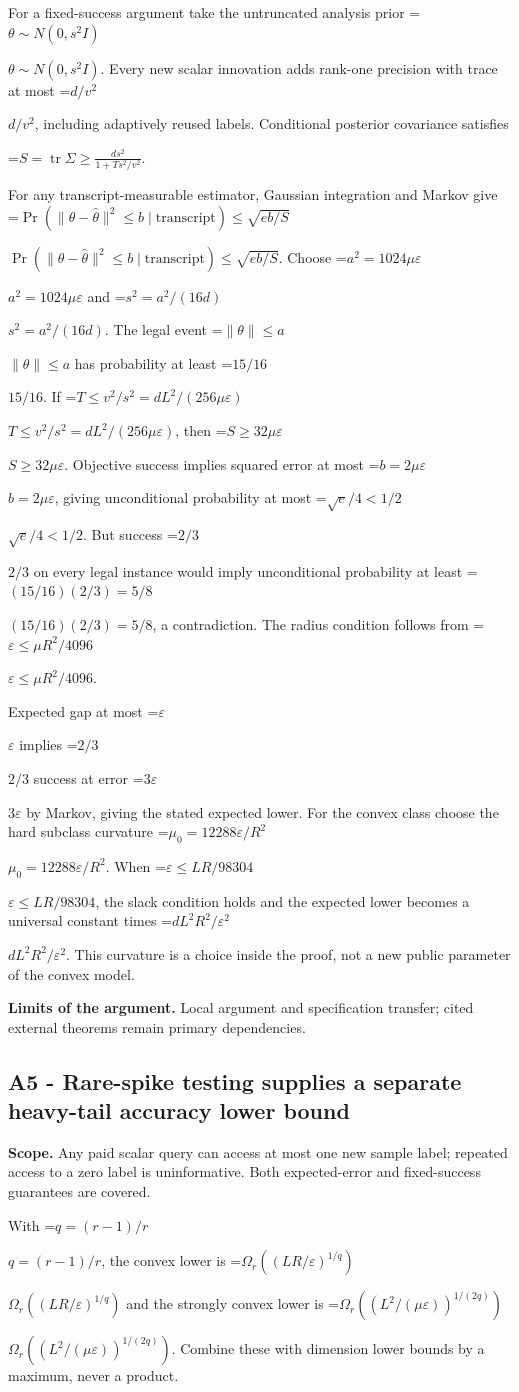 \documentclass[10pt,a4paper]{article}
\newcommand{\AtlasMath}[1]{\par\begingroup\centering\setbox0=\hbox{$\displaystyle #1$}\ifdim\wd0>1.4\linewidth\typeout{ATLAS WIDE FORMULA: \the\wd0}\fi\ifdim\wd0>\linewidth\resizebox{\linewidth}{!}{\box0}\else\box0\fi\par\endgroup}
\newcommand{\AtlasInlineMath}[1]{\begingroup\setbox0=\hbox{$#1$}\ifdim\wd0>.4\linewidth\endgroup\AtlasMath{#1}\else\endgroup$#1$\fi}
\begin{document}
For a fixed-success argument take the untruncated analysis prior \AtlasInlineMath{\theta\sim N(0,s^2I)}. Every new scalar innovation adds rank-one precision with trace at most \AtlasInlineMath{d/v^2}, including adaptively reused labels. Conditional posterior covariance satisfies

\AtlasMath{S=\operatorname{tr}\Sigma\ge\frac{ds^2}{1+Ts^2/v^2}.}

For any transcript-measurable estimator, Gaussian integration and Markov give \AtlasInlineMath{\Pr(\|\theta-\widehat\theta\|^2\le b\mid\text{transcript})\le\sqrt{eb/S}}. Choose \AtlasInlineMath{a^2=1024\mu\varepsilon} and \AtlasInlineMath{s^2=a^2/(16d)}. The legal event \AtlasInlineMath{\|\theta\|\le a} has probability at least \AtlasInlineMath{15/16}. If \AtlasInlineMath{T\le v^2/s^2=dL^2/(256\mu\varepsilon)}, then \AtlasInlineMath{S\ge32\mu\varepsilon}. Objective success implies squared error at most \AtlasInlineMath{b=2\mu\varepsilon}, giving unconditional probability at most \AtlasInlineMath{\sqrt e/4<1/2}. But success \AtlasInlineMath{2/3} on every legal instance would imply unconditional probability at least \AtlasInlineMath{(15/16)(2/3)=5/8}, a contradiction. The radius condition follows from \AtlasInlineMath{\varepsilon\le\mu R^2/4096}.

Expected gap at most \AtlasInlineMath{\varepsilon} implies \AtlasInlineMath{2/3} success at error \AtlasInlineMath{3\varepsilon} by Markov, giving the stated expected lower. For the convex class choose the hard subclass curvature \AtlasInlineMath{\mu_0=12288\varepsilon/R^2}. When \AtlasInlineMath{\varepsilon\le LR/98304}, the slack condition holds and the expected lower becomes a universal constant times \AtlasInlineMath{dL^2R^2/\varepsilon^2}. This curvature is a choice inside the proof, not a new public parameter of the convex model.

\textbf{Limits of the argument.} Local argument and specification transfer; cited external theorems remain primary dependencies.

\subsection{A5 - Rare-spike testing supplies a separate heavy-tail accuracy lower bound}
\textbf{Scope.} Any paid scalar query can access at most one new sample label; repeated access to a zero label is uninformative. Both expected-error and fixed-success guarantees are covered.

With \AtlasInlineMath{q=(r-1)/r}, the convex lower is \AtlasInlineMath{\Omega_r((LR/\varepsilon)^{1/q})} and the strongly convex lower is \AtlasInlineMath{\Omega_r((L^2/(\mu\varepsilon))^{1/(2q)})}. Combine these with dimension lower bounds by a maximum, never a product.
\end{document}
